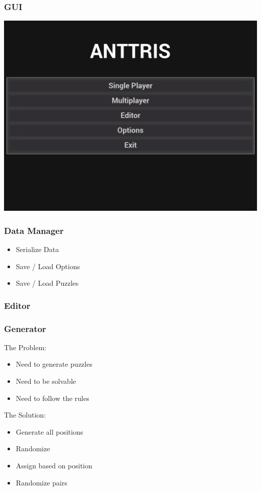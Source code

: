 \documentclass{beamer}
\begin{document}
\begin{frame}
    \frametitle{GUI} %
    \includegraphics[width=1\linewidth]{Anttris_MainMenu.png}
\end{frame}

\begin{frame}
    \frametitle{Data Manager} %
    \begin{itemize}
	\item Serialize Data
	\pause \item Save / Load Options
	\pause \item Save / Load Puzzles
	\end{itemize}
\end{frame}

\begin{frame}
    \frametitle{Editor} %
\end{frame}

\begin{frame}
    \frametitle{Generator} %
    The Problem:
    \begin{itemize}
	\pause \item Need to generate puzzles
	\pause \item Need to be solvable
	\pause \item Need to follow the rules
	\end{itemize}
	
	\pause The Solution:
	\begin{itemize}
	\pause \item Generate all positions
	\pause \item Randomize
	\pause \item Assign based on position
	\pause \item Randomize pairs
	\end{itemize}
\end{frame}
\end{document}
